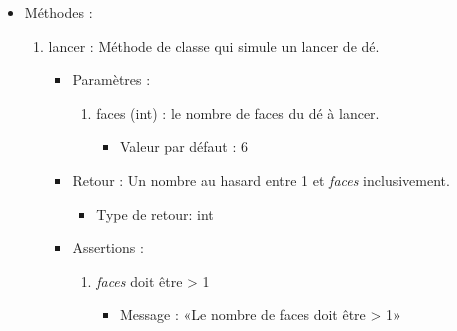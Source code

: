 \documentclass[12pt,pdftex,oneside]{article}
\begin{document}
  \begin{itemize}

  \item Méthodes : 

    \begin{enumerate}
    \item lancer : Méthode de classe qui simule un lancer de dé.
      \begin{itemize}
      \item Paramètres : 
        \begin{enumerate}
        \item faces (int) : le nombre de faces du dé à lancer.
          \begin{itemize}
          \item Valeur par défaut : 6
          \end{itemize}
      \end{enumerate}
      \item Retour : Un nombre au hasard entre 1 et \emph{faces} inclusivement.
          \begin{itemize}
          \item Type de retour: int
          \end{itemize}
      \item Assertions : 
        \begin{enumerate}
        \item \emph{faces} doit être > 1
          \begin{itemize}
          \item Message : «Le nombre de faces doit être > 1»
          \end{itemize}
        \end{enumerate}
      \end{itemize}
    \end{enumerate}

  \end{itemize}
\end{document}
